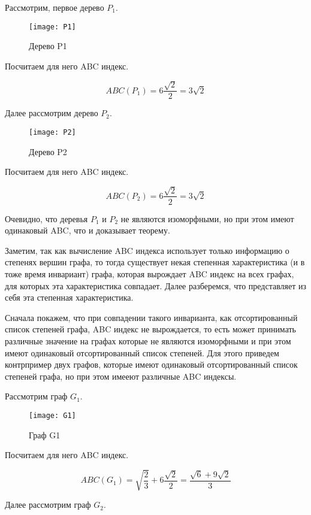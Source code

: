 \documentclass{article}
\begin{document}
\newpage

Рассмотрим, первое дерево $P_1$.

\begin{figure}[h]
\texttt{[image: P1]}
\centering
\caption{Дерево P1}
\end{figure}

Посчитаем для него ABC индекс.

$$ ABC(P_1) = 6 \frac{\sqrt{2}}{2} = 3 \sqrt{2} $$

Далее рассмотрим дерево $P_2$.

\begin{figure}[h]
\texttt{[image: P2]}
\centering
\caption{Дерево P2}
\end{figure}

Посчитаем для него ABC индекс.

$$ ABC(P_2) = 6 \frac{\sqrt{2}}{2} = 3 \sqrt{2} $$

Очевидно, что деревья $P_1$ и $P_2$ не являются изоморфными, но при этом имеют одинаковый ABC, что и доказывает теорему.

\bigskip

Заметим, так как вычисление ABC индекса использует только информацию о степенях вершин графа, то тогда существует некая степенная характеристика (и в тоже время инвариант) графа, которая вырождает ABC индекс на всех графах, для которых эта характеристика совпадает. Далее разберемся, что представляет из себя эта степенная характеристика.

Сначала покажем, что при совпадении такого инварианта, как отсортированный список степеней графа, ABC индекс не вырождается, то есть может принимать различные значение на графах которые не являются изоморфными и при этом имеют одинаковый отсортированный список степеней. Для этого приведем контрпример двух графов, которые имеют одинаковый отсортированный список степеней графа, но при этом имееют различные ABC индексы.

\newpage

Рассмотрим граф $G_1$. 

\begin{figure}[h]
\texttt{[image: G1]}
\centering
\caption{Граф G1}
\end{figure}

Посчитаем для него ABC индекс.

$$ ABC(G_1) = \sqrt{\frac{2}{3}} + 6 \frac{\sqrt{2}}{2} = \frac{\sqrt{6} + 9 \sqrt{2}}{3} $$

Далее рассмотрим граф $G_2$.
\end{document}
